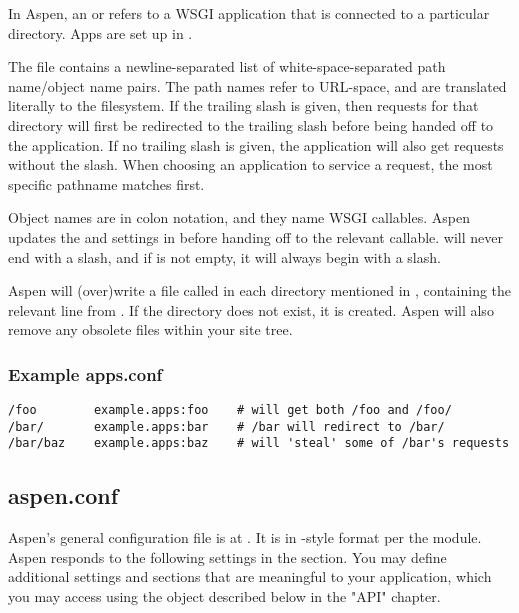 In Aspen, an  or  refers to a WSGI application that is
connected to a particular directory. Apps are set up in .

The  file contains a newline-separated list of
white-space-separated path name/object name pairs. The path names refer to
URL-space, and are translated literally to the filesystem. If the trailing slash
is given, then requests for that directory will first be redirected to the
trailing slash before being handed off to the application. If no trailing slash
is given, the application will also get requests without the slash. When
choosing an application to service a request, the most specific pathname matches
first.

Object names are in colon notation, and they name WSGI callables. Aspen updates
the  and  settings in  before
handing off to the relevant callable.  will never end with a
slash, and if  is not empty, it will always begin with a slash.

Aspen will (over)write a file called  in each directory
mentioned in , containing the relevant line from
. If the directory does not exist, it is created. Aspen will
also remove any obsolete  files within your site tree.


\subsubsection{Example apps.conf}

\begin{verbatim}
/foo        example.apps:foo    # will get both /foo and /foo/
/bar/       example.apps:bar    # /bar will redirect to /bar/
/bar/baz    example.apps:baz    # will 'steal' some of /bar's requests
\end{verbatim}


\subsection{aspen.conf}
\label{aspen-conf}

Aspen's general configuration file is at . It is in
-style format per the  module. Aspen responds to
the following settings in the  section. You may define additional
settings and sections that are meaningful to your application, which you may
access using the  object described below in the "API" chapter.

